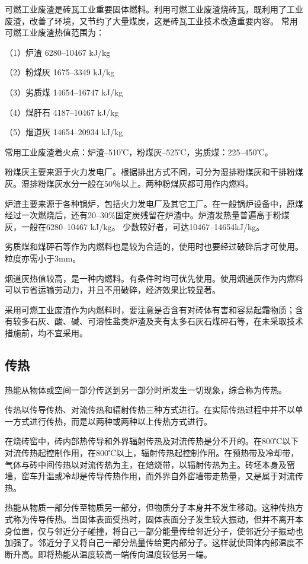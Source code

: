 \documentclass{ctexbook}
\begin{document}
可燃工业废渣是砖瓦工业重要固体燃料。利用可燃工业废渣烧砖瓦，既利用了工业废渣，改善了环境，又节约了大量煤炭，这是砖瓦工业技术改造重要内容。
常用可燃工业废渣热值范围为：

（1）炉渣	6280--10467 kJ/kg

（2）粉煤灰	1675--3349 kJ/kg

（3）劣质煤	14654--16747 kJ/kg

（4）煤肝石	4187--10467 kJ/kg

（5）烟道灰  14654--20934 kJ/kg

常用工业废渣着火点：炉渣--510℃，粉煤灰--525℃，劣质煤：225--450℃。

粉煤灰主要来源于火力发电厂。根据排出方式不同，可分为湿排粉煤灰和干排粉煤灰。湿排粉煤灰水分一般在50％以上。两种粉煤灰都可用作内燃料。

炉渣主要来源于各种锅炉，包括火力发电厂及其它工厂。在一般锅炉设备中，原煤经过一次燃烧后，还有20--30\%固定炭残留在炉渣中。炉渣发热量普遍高于粉煤灰，一般在6280--10467 kJ/kg。
少数较好者，可达10467--14654kJ/kg。

劣质煤和煤砰石等作为内燃料也是较为合适的，使用时也要经过破碎后才可使用。粒度亦需小于3mm。

烟道灰热值较高，是一种内燃料。有条件时均可优先使用。使用烟道灰作为内燃料可以节省运输劳动力，并且不用破碎，经济效果比较显著。

采用可燃工业废渣作为内燃料时，要注意是否含有对砖体有害和容易起霜物质；含有较多石灰、酸、碱、可溶性盐类炉渣及夹有太多石灰石煤砰石等，在未采取技术措施前，均不宜采用。
\subsection{传热}
热能从物体或空间一部分传送到另一部分时所发生一切现象，综合称为传热。

传热以传导传热、对流传热和辐射传热三种方式进行。在实际传热过程中并不以单一方式进行传热，而是以两种或两种以上传热方式进行。

在烧砖窑中，砖内部热传导和外界辐射传热及对流传热是分不开的。在800℃以下对流传热起控制作用，在800℃以上，辐射传热起控制作用。在预热带及冷却带，气体与砖中间传热以对流传热为主，在焙烧带，以辐射传热为主。砖坯本身及窑墙，窑车升温或冷却是传导传热作用，而外界自外窑墙带走热量，又是属于对流传热。

热能从物质一部分传至物质另一部分，但物质分子本身并不发生移动。这种传热方式称为传导传热。当固体表面受热时，固体表面分子发生较大振动，但并不离开本身位置，仅与邻近分子碰撞，将自己一部分能量传给邻近分子，使邻近分子振动也加强了。邻近分子又将自己一部分热量传给更内部分子。这样就使固体内部温度不断升高。即将热能从温度较高一端传向温度较低另一端。
\end{document}
